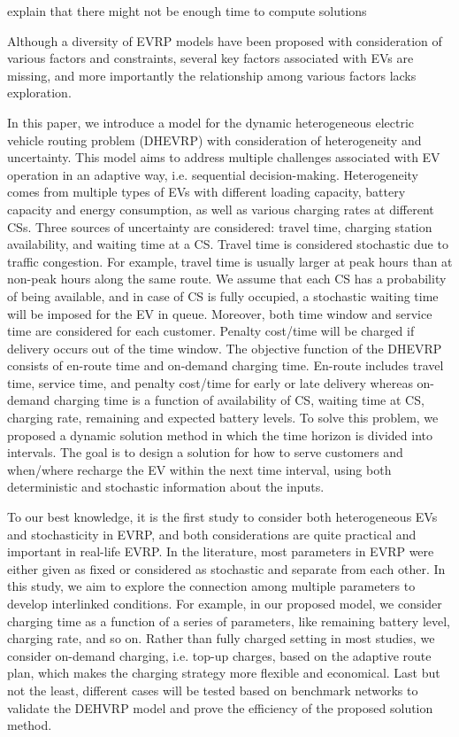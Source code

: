 \documentclass[11pt]{article}
\begin{document}
explain that there might not be enough time to compute solutions

Although a diversity of EVRP models have been proposed with consideration of various factors and constraints, several key factors associated with EVs are missing, and more importantly the relationship among various factors lacks exploration. 

In this paper, we introduce a model for the dynamic heterogeneous electric vehicle routing problem (DHEVRP) with consideration of heterogeneity and uncertainty. This model aims to address multiple challenges associated with EV operation in an adaptive way, i.e. sequential decision-making. Heterogeneity comes from multiple types of EVs with different loading capacity, battery capacity and energy consumption, as well as various charging rates at different CSs. Three sources of uncertainty are considered: travel time, charging station availability, and waiting time at a CS. Travel time is considered stochastic due to traffic congestion. For example, travel time is usually larger at peak hours than at non-peak hours along the same route. We assume that each CS has a probability of being available, and in case of CS is fully occupied, a stochastic waiting time will be imposed for the EV in queue. Moreover, both time window and service time are considered for each customer. Penalty cost/time will be charged if delivery occurs out of the time window. The objective function of the DHEVRP consists of en-route time and on-demand charging time. En-route includes travel time, service time, and penalty cost/time for early or late delivery whereas on-demand charging time is a function of availability of CS, waiting time at CS, charging rate, remaining and expected battery levels. To solve this problem, we proposed a dynamic solution method in which the time horizon is divided into intervals. The goal is to design a solution for how to serve customers and when/where recharge the EV within the next time interval, using both deterministic and stochastic information about the inputs.

To our best knowledge, it is the first study to consider both heterogeneous EVs and stochasticity in EVRP, and both considerations are quite practical and important in real-life EVRP. In the literature, most parameters in EVRP were either given as fixed or considered as stochastic and separate from each other. In this study, we aim to explore the connection among multiple parameters to develop interlinked conditions. For example, in our proposed model, we consider charging time as a function of a series of parameters, like remaining battery level, charging rate, and so on. Rather than fully charged setting in most studies, we consider on-demand charging, i.e. top-up charges, based on the adaptive route plan, which makes the charging strategy more flexible and economical. Last but not the least, different cases will be tested based on benchmark networks to validate the DEHVRP model and prove the efficiency of the proposed solution method.
\end{document}
